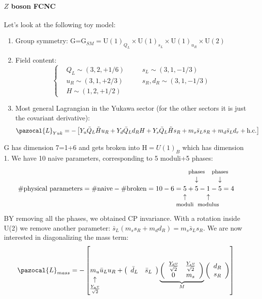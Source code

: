 \documentclass[../main.tex]{subfiles}
\begin{document}
\paragraph{$Z$ boson FCNC}
Let's look at the following toy model:
\begin{enumerate}
    \item Group symmetry: G=G$_{SM}=$U$(1)_{Q_L}\times$U$(1)_{s_L}\times$U$(1)_{u_R}\times$U$(2)$
    \item Field content: 
    \[
    \left\{
    \begin{aligned}
    &Q_L\sim(3,2,+1/6) \quad &&s_L\sim(3,1,-1/3)\\
    &u_R\sim(3,1,+2/3) \quad &&s_R,d_R\sim(3,1,-1/3)\\
    &H\sim(1,2,+1/2)
    \end{aligned}
    \right.
    \]
    \item Most general Lagrangian in the Yukawa sector (for the other sectors it is just the covariant derivative):
    \[
    \pazocal{L}_{Yuk}=-\left[Y_u\bar{Q}_L\Tilde{H}u_R+Y_d\bar{Q}_Ld_RH+Y_s\bar{Q}_L\Tilde{H}s_R+m_s\bar{s}_Ls_R+m_d\bar{s}_Ld_r+\text{h.c.}\right]
    \]
\end{enumerate}
G has dimension 7=1+6 and gets broken into H$=U(1)_B$ which has dimension 1. We have 10 naive parameters, corresponding to 5 moduli+5 phases:
\[
\text{\#physical parameters}=\text{\#naive}-\text{\#broken}=10-6=\underset{\mathclap{\tikz \node {$\uparrow$} node [below=1ex] {\footnotesize moduli };}}{5}+\overset{\mathclap{\tikz \node {$\downarrow$} node [above=1ex] {\footnotesize  phases};}}{5}-\underset{\mathclap{\tikz \node {$\uparrow$} node [below=1ex] {\footnotesize modulus};}}{1}-\overset{\mathclap{\tikz \node {$\downarrow$} node [above=1ex] {\footnotesize phases };}}{5}=4
\]
BY removing all the phases, we obtained CP invariance. With a rotation inside U(2) we remove another parameter: $\bar{s}_L(m_ss_R+m_dd_R)=m_s\bar{s}_Ls_R$. We are now interested in diagonalizing the mass term:
\[
\pazocal{L}_{mass}=-\left[\underset{\mathclap{\tikz \node {$\uparrow$} node [below=1ex] {\footnotesize  $\frac{Y_uv}{\sqrt{2}}$};}}{m_u}\bar{u}_Lu_R+\left(\begin{array}{cc}
    \bar{d}_L & \bar{s}_L
\end{array}\right)
\underbrace{\left(\begin{array}{cc}
    \frac{Y_dv}{\sqrt{2}} & \frac{Y_sv}{\sqrt{2}} \\
    0 & m_s
\end{array}\right)}_{M}
\left(\begin{array}{c}
    d_R\\
    s_R
\end{array}\right)\right]
\]
\end{document}
